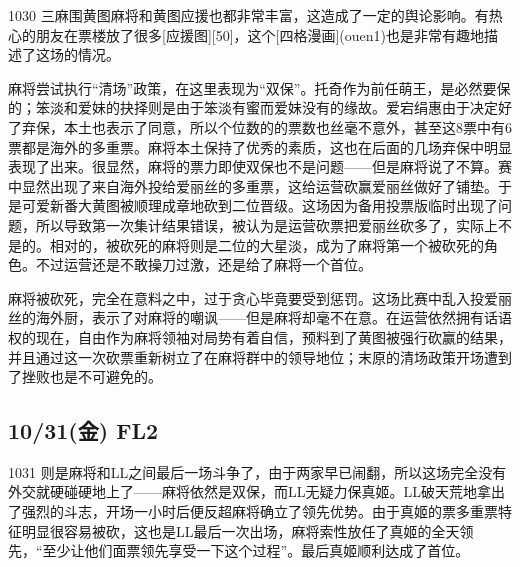 1030 三麻围黄图麻将和黄图应援也都非常丰富，这造成了一定的舆论影响。有热心的朋友在票楼放了很多[应援图][50]，这个[四格漫画](ouen1)也是非常有趣地描述了这场的情况。

麻将尝试执行“清场”政策，在这里表现为“双保”。托奇作为前任萌王，是必然要保的；笨淡和爱妹的抉择则是由于笨淡有蜜而爱妹没有的缘故。爱宕绢惠由于决定好了弃保，本土也表示了同意，所以个位数的的票数也丝毫不意外，甚至这8票中有6票都是海外的多重票。麻将本土保持了优秀的素质，这也在后面的几场弃保中明显表现了出来。很显然，麻将的票力即使双保也不是问题——但是麻将说了不算。赛中显然出现了来自海外投给爱丽丝的多重票，这给运营砍赢爱丽丝做好了铺垫。于是可爱新番大黄图被顺理成章地砍到二位晋级。这场因为备用投票版临时出现了问题，所以导致第一次集计结果错误，被认为是运营砍票把爱丽丝砍多了，实际上不是的。相对的，被砍死的麻将则是二位的大星淡，成为了麻将第一个被砍死的角色。不过运营还是不敢操刀过激，还是给了麻将一个首位。

麻将被砍死，完全在意料之中，过于贪心毕竟要受到惩罚。这场比赛中乱入投爱丽丝的海外厨，表示了对麻将的嘲讽——但是麻将却毫不在意。在运营依然拥有话语权的现在，自由作为麻将领袖对局势有着自信，预料到了黄图被强行砍赢的结果，并且通过这一次砍票重新树立了在麻将群中的领导地位；末原的清场政策开场遭到了挫败也是不可避免的。

\subsection{10/31(金) FL2}


1031 则是麻将和LL之间最后一场斗争了，由于两家早已闹翻，所以这场完全没有外交就硬碰硬地上了——麻将依然是双保，而LL无疑力保真姬。LL破天荒地拿出了强烈的斗志，开场一小时后便反超麻将确立了领先优势。由于真姬的票多重票特征明显很容易被砍，这也是LL最后一次出场，麻将索性放任了真姬的全天领先，“至少让他们面票领先享受一下这个过程”。最后真姬顺利达成了首位。

